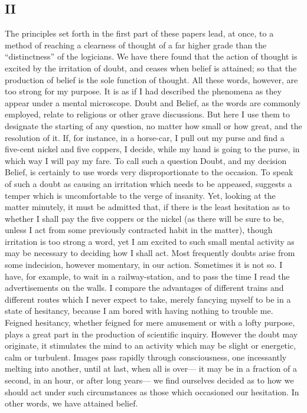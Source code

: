 \documentclass[]{article}
\begin{document}
\subsection*{II}

The principles set forth in the first part of these papers lead, at once, to a method of reaching a clearness of thought of a far higher grade than the ``distinctness'' of the logicians. We have there found that the action of thought is excited by the irritation of doubt, and ceases when belief is attained; so that the production of belief is the sole function of thought. All these words, however, are too strong for my purpose. It is as if I had described the phenomena as they appear under a mental microscope. Doubt and Belief, as the words are commonly employed, relate to religious or other grave discussions. But here I use them to designate the starting of any question, no matter how small or how great, and the resolution of it. If, for instance, in a horse-car, I pull out my purse and find a five-cent nickel and five coppers, I decide, while my hand is going to the purse, in which way I will pay my fare. To call such a question Doubt, and my decision Belief, is certainly to use words very disproportionate to the occasion. To speak of such a doubt as causing an irritation which needs to be appeased, suggests a temper which is uncomfortable to the verge of insanity. Yet, looking at the matter
minutely, it must be admitted that, if there is the least hesitation as to whether I shall pay the five coppers or the nickel (as there will be sure to be, unless I act  from some previously contracted habit in the matter), though irritation is too strong a word, yet I am excited to such small mental activity as may be necessary to deciding how I shall act. Most frequently doubts arise from some indecision, however momentary, in our action. Sometimes it is not so. I have, for example, to wait in a railway-station, and to pass the time I read the advertisements on the walls. I compare the advantages of different trains and different routes which I never expect to take, merely fancying myself to be in a state of hesitancy, because I am bored with having nothing to trouble me. Feigned hesitancy, whether feigned for mere amusement or with a lofty purpose, plays a great part in the production of scientific inquiry. However the doubt may originate, it stimulates the mind to an activity which may be slight or energetic, calm or turbulent. Images pass rapidly through consciousness, one incessantly melting into another, until at last, when all is over--- it may be in a fraction of a second, in an hour, or after long years--- we find ourselves decided as to how we should act under
such circumstances as those which occasioned our hesitation. In other words, we have attained belief.
 
\end{document}
